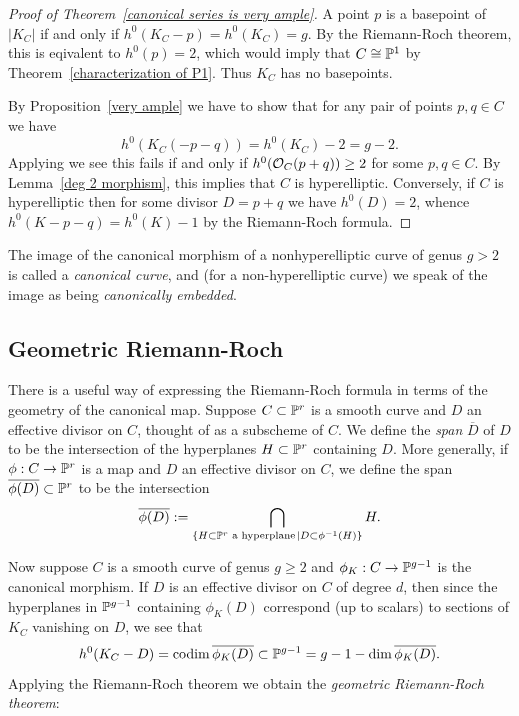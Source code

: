 \begin{proof}[Proof of Theorem~\ref{canonical series is very ample}]
A point $p$ is a basepoint of $|K_C|$ if and only if $h^0(K_C-p) = h^0(K_C) = g$. By the Riemann-Roch theorem,
this is eqivalent to $h^0(p) =2$, which would imply that $C\cong {\mathbb P}^1$ by Theorem~\ref{characterization of P1}. Thus $K_C$
has no basepoints.

By Proposition~\ref{very ample} we have to show that for any pair of points $p, q \in C$ we have
$$
h^0(K_C(-p-q)) = h^0(K_C)-2 = g-2.
$$
Applying \trr we see this fails if and only if $h^0({\mathcal O}_C(p+q)) \geq 2$ for some $p,q \in C$. By Lemma~\ref{deg 2 morphism}, this implies that $C$ is hyperelliptic. Conversely, if $C$ is hyperelliptic then for some divisor $D = p+q$ we have $h^0(D) = 2$, whence $h^0(K-p-q) = h^0(K) -1$ by
the Riemann-Roch formula.
\end{proof}

The image of the canonical morphism of a nonhyperelliptic curve of genus $g>2$ is called a \emph{canonical curve}, and (for a non-hyperelliptic curve) we 
speak of the image as being \emph{canonically embedded}.


\subsection{Geometric Riemann-Roch}

There is a useful way of expressing the Riemann-Roch formula in terms of the geometry of the canonical map. Suppose $C \subset {\mathbb P}^r$ is a smooth curve and $D$ an effective divisor on $C$, thought of as a subscheme of $C$. We define the \emph{span} $\overline D$ of $D$ to be the intersection of the hyperplanes $H \subset {\mathbb P}^r$ containing $D$. More generally, if $\phi : C \to {\mathbb P}^r$ is a map and $D$ an effective divisor on $C$, we define the span $\overline{\phi(D)} \subset {\mathbb P}^r$ to be the intersection
$$
\overline{\phi(D)} := \bigcap_{ \{H \subset {\mathbb P}^r \text{ a hyperplane}\kern1pt \mid D \subset \phi^{-1}(H)\}} H.
$$

Now suppose $C$ is a smooth curve of genus $g\geq 2$ and $\phi_K: C\to {\mathbb P}^{g-1}$ is the canonical morphism.
If  $D$ is an effective divisor on $C$ of degree $d$, then since the hyperplanes in ${\mathbb P}^{g-1}$ containing $\phi_K(D)$ correspond (up to scalars) to sections of $K_C$ vanishing on $D$, we see that
$$
h^0(K_C-D) = \operatorname{codim} \overline{ \phi_K(D)} \subset {\mathbb P}^{g-1}= g - 1 - \dim \overline{ \phi_K(D)}.
$$
Applying the Riemann-Roch theorem we obtain  the \emph{geometric Riemann-Roch theorem}:

